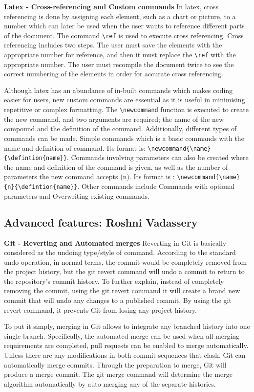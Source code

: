 \documentclass[a4paper, 11pt]{report}
\begin{document}
\textbf{Latex - Cross-referencing and Custom commands}
In latex, cross referencing is done by assigning each element, such as a chart or picture, to a number which can later be used when the user wants to reference different parts of the document. The command \verb|\ref| is used to execute cross referencing. Cross referencing includes two steps. The user must save the elements with the appropriate number for reference, and then it must replace the \verb|\ref| with the appropriate number. The user must recompile the document twice to see the correct numbering of the elements in order for accurate cross referencing.

Although latex has an abundance of in-built commands which makes coding easier for users, new custom commands are essential as it is useful in minimising repetitive or complex formatting. The \verb|\newcommand| function is executed to create the new command, and two arguments are required; the name of the new compound and the definition of the command. Additionally, different types of commands can be made. Simple commands which is a basic commands with the name and definition of command. Its format is: \verb|\newcommand{\name}{\defintion{name}}|. Commands involving parameters can also be created where the name and definition of the command is given, as well as the number of parameters the new command accepts (n). Its format is : \verb|\newcommand{\name}{n}{\defintion{name}}|. Other commands include Commands with optional parameters and Overwriting existing commands.

\subsection{Advanced features: Roshni Vadassery}

\textbf{Git - Reverting and Automated merges}
Reverting in Git is basically considered as the undoing type/style of command. According to the standard undo operation, in normal terms, the commit would be completely removed from the project history, but the git revert command will undo a commit to return to the repository's commit history. To further explain, instead of completely removing the commit, using the git revert command it will create a brand new commit that will undo any changes to a published commit. By using the git revert command, it prevents Git from losing any project history.

To put it simply, merging in Git allows to integrate any branched history into one single branch. Specifically, the automated merge can be used when all merging requirements are completed, pull requests can be enabled to merge automatically. Unless there are any modifications in both commit sequences that clash, Git can automatically merge commits. Through the preparation to merge, Git will produce a merge commit.  The git merge command will determine the merge algorithm automatically by auto merging any of the separate histories.
\end{document}
